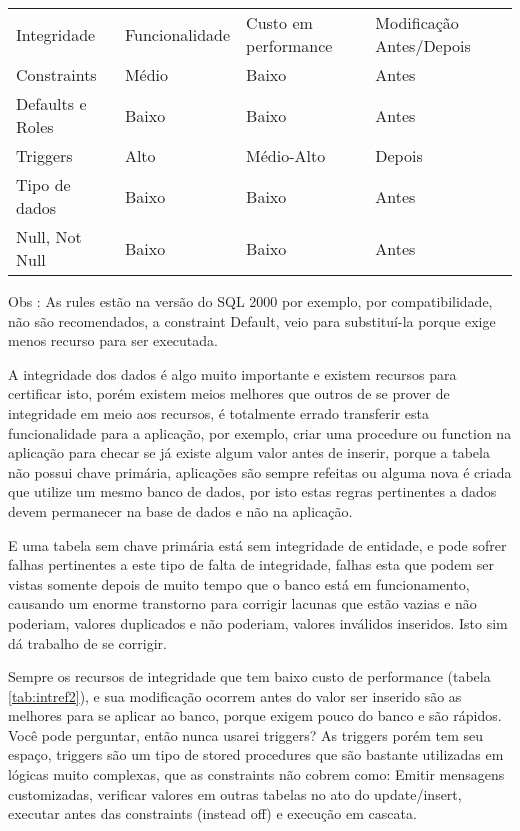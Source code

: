 \begin{center}
	\begin{tabular}{llll}

	Integridade & Funcionalidade & Custo em performance & Modificação Antes/Depois \\
	Constraints & Médio & Baixo & Antes \\
	Defaults e Roles & Baixo & Baixo & Antes \\
	Triggers & Alto & Médio-Alto & Depois \\
	Tipo de dados & Baixo & Baixo & Antes \\
	Null, Not Null & Baixo & Baixo & Antes \\


	\end{tabular}
	\label{tab:intref2}
\end{center}

Obs : As rules estão na versão do SQL 2000 por exemplo, por compatibilidade, não são recomendados, a constraint Default, veio para substituí-la porque exige menos recurso para ser executada.

A integridade dos dados é algo muito importante e existem recursos para certificar isto, porém existem meios melhores que outros de se prover de integridade em meio aos recursos, é totalmente errado transferir esta funcionalidade para a aplicação, por exemplo, criar uma procedure ou function na aplicação para checar se já existe algum valor antes de inserir, porque a tabela não possui chave primária, aplicações são sempre refeitas ou alguma nova é criada que utilize um mesmo banco de dados, por isto estas regras pertinentes a dados devem permanecer na base de dados e não na aplicação.

E uma tabela sem chave primária está sem integridade de entidade, e pode sofrer falhas pertinentes a este tipo de falta de integridade, falhas esta que podem ser vistas somente depois de muito tempo que o banco está em funcionamento, causando um enorme transtorno para corrigir lacunas que estão vazias e não poderiam, valores duplicados e não poderiam, valores inválidos inseridos. Isto sim dá trabalho de se corrigir.

Sempre os recursos de integridade que tem baixo custo de performance (tabela \ref{tab:intref2}), e sua modificação ocorrem antes do valor ser inserido são as melhores para se aplicar ao banco, porque exigem pouco do banco e são rápidos. Você pode perguntar, então nunca usarei triggers? As triggers porém tem seu espaço, triggers são um tipo de stored procedures que são bastante utilizadas em lógicas muito complexas, que as constraints não cobrem como: Emitir mensagens customizadas, verificar valores em outras tabelas no ato do update/insert, executar antes das constraints (instead off) e execução em cascata.


